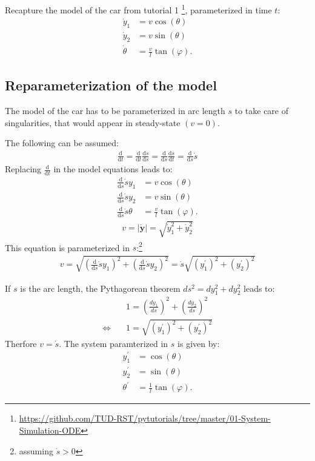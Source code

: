 \documentclass[a4paper,11pt,headings=standardclasses,parskip=half]{scrartcl}
\renewcommand{\d}{\mathrm{d}} %
\begin{document}
Recapture the model of the car from tutorial 1 \footnote{\url{https://github.com/TUD-RST/pytutorials/tree/master/01-System-Simulation-ODE}}, parameterized in time $t$:
\begin{subequations}
\begin{align}
\dot y_1 &= v \cos(\theta)\\
\dot y_2 &= v \sin(\theta)\\
\dot \theta &= \frac{v}{l}\tan(\varphi).
\end{align}
\end{subequations}
\subsection{Reparameterization of the model}
The model of the car has to be parameterized in arc length $s$ to take care of singularities, that would appear in steady-state $(v=0)$.

The following can be assumed:
\begin{align*}
\frac{\d}{\d t} = \frac{\d}{\d t}\frac{\d s}{\d s} = \frac{\d}{\d s}\frac{\d s}{\d t} = \frac{\d}{\d s}\dot s
\end{align*}
Replacing $\frac{\d}{\d t}$ in the model equations leads to:
\begin{subequations}
\begin{align}
\frac{\d}{\d s}\dot s y_1 &= v \cos(\theta)\\
\frac{\d}{\d s}\dot s y_2 &= v \sin(\theta)\\
\frac{\d}{\d s}\dot s \theta &= \frac{v}{l}\tan(\varphi).
\end{align}
\end{subequations}
\begin{align}
v = |\dot{\bm{y}}| = \sqrt{\dot y_1^2+\dot y_2^2}
\end{align}
This equation is parameterized in $s$:\footnote{assuming $\dot s > 0$} 
\begin{align}
v = \sqrt{(\frac{\d}{\d s}\dot sy_1)^2+(\frac{\d}{\d s}\dot s y_2)^2}=\dot s \sqrt{(y_1^\prime)^2+(y_2^\prime)^2}
\end{align}
 
If $s$ is the arc length, the Pythagorean theorem $ds^2 = dy_1^2 + dy_2^2$ leads to:
\begin{subequations}
\begin{align}
&1 = \left(\frac{dy_1}{ds}\right)^2 + \left(\frac{dy_2}{ds}\right)^2  \\
\Leftrightarrow \quad & 1 = \sqrt{(y_1^\prime)^2+(y_2^\prime)^2}
\end{align}
\end{subequations}
Therfore $v=\dot s$. 
The system paramterized in $s$ is given by:
\begin{subequations}
\begin{align}
y_1^\prime &= \cos(\theta)\\
y_2^\prime &= \sin(\theta)\\
\theta^\prime &= \frac{1}{l}\tan(\varphi).
\end{align}
\end{subequations}
\end{document}
